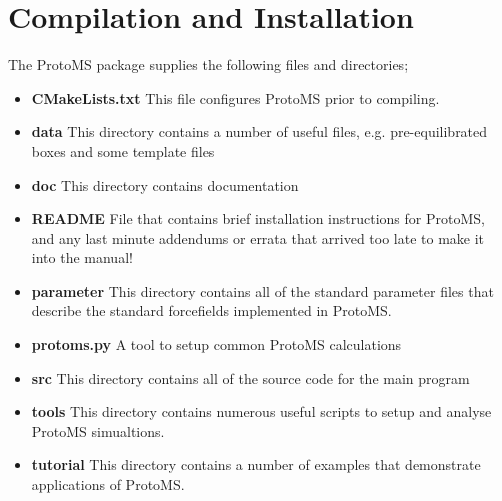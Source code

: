 \documentclass[letterpaper,10pt,english]{sphinxmanual}
\begin{document}
\chapter{Compilation and Installation}
\label{compilation:compilation-and-installation}\label{compilation::doc}
The ProtoMS package supplies the following files and directories;
\begin{itemize}
\item {} 
\textbf{CMakeLists.txt} This file configures ProtoMS prior to compiling.

\item {} 
\textbf{data} This directory contains a number of useful files, e.g. pre-equilibrated boxes and some template files

\item {} 
\textbf{doc} This directory contains documentation

\item {} 
\textbf{README} File that contains brief installation instructions for ProtoMS, and any last minute addendums or errata that arrived too late to make it into the manual!

\item {} 
\textbf{parameter} This directory contains all of the standard parameter files that describe the standard forcefields implemented in ProtoMS.

\item {} 
\textbf{protoms.py} A tool to setup common ProtoMS calculations

\item {} 
\textbf{src} This directory contains all of the source code for the main program

\item {} 
\textbf{tools} This directory contains numerous useful scripts to setup and analyse ProtoMS simualtions.

\item {} 
\textbf{tutorial} This directory contains a number of examples that demonstrate applications of ProtoMS.

\end{itemize}
\end{document}
